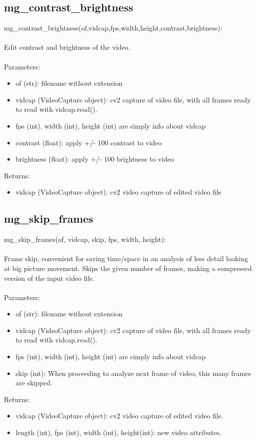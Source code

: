 \documentclass[9pt]{extarticle}
\begin{document}
\subsection{mg\_contrast\_brightness}
    mg\_contrast\_brightness(of,vidcap,fps,width,height,contrast,brightness):\\\\
    Edit contrast and brightness of the video.\\\\
    Parameters:
    \begin{itemize}
    \item []of (str): filename without extension
    \item [] vidcap (VideoCapture object): cv2 capture of video file, with all frames ready to read with vidcap.read().
    \item [] fps (int), width (int), height (int) are simply info about vidcap
    \item [] contrast (float): apply +/- 100 contrast to video
    \item [] brightness (float): apply +/- 100 brightness to video
    \end{itemize}
    Returns:
    \begin{itemize}
    \item [] vidcap (VideoCapture object): cv2 video capture of edited video file
    \end{itemize}


\subsection{mg\_skip\_frames}
    mg\_skip\_frames(of, vidcap, skip, fps, width, height):
    \\\\
    Frame skip, convenient for saving time/space in an analysis of less detail looking at big picture movement. Skips the given number of frames, making a compressed version of the input video file.
    \\\\
    Parameters:
    \begin{itemize}
    \item []of (str): filename without extension
    \item []vidcap (VideoCapture object): cv2 capture of video file, with all frames ready to read with vidcap.read().
    \item []fps (int), width (int), height (int) are simply info about vidcap
    \item []skip (int): When proceeding to analyze next frame of video, this many frames are skipped.
    \end{itemize}
    Returns:
    \begin{itemize}
       \item [] vidcap (VideoCapture object): cv2 video capture of edited video file.
       \item [] length (int), fps (int), width (int), height(int): new video attributes.
   \end{itemize}
\end{document}
